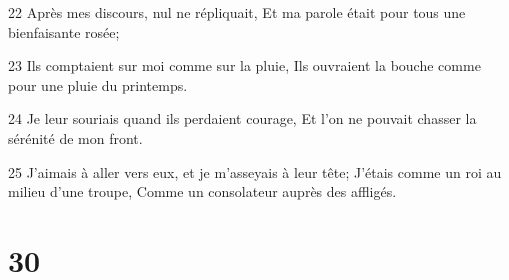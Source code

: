 \par 22 Après mes discours, nul ne répliquait, Et ma parole était pour tous une bienfaisante rosée;
\par 23 Ils comptaient sur moi comme sur la pluie, Ils ouvraient la bouche comme pour une pluie du printemps.
\par 24 Je leur souriais quand ils perdaient courage, Et l'on ne pouvait chasser la sérénité de mon front.
\par 25 J'aimais à aller vers eux, et je m'asseyais à leur tête; J'étais comme un roi au milieu d'une troupe, Comme un consolateur auprès des affligés.

\chapter{30}


